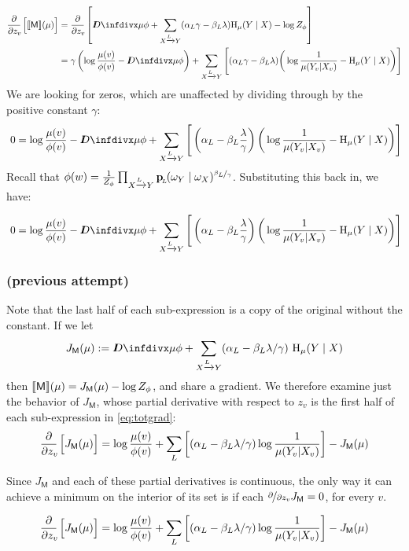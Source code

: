 \documentclass{article}
\newcommand{\sfM}{\mathsf M}
\newcommand{\alle}[1][L]{_{ X \xrightarrow{\!\!#1} Y }}
\begin{document}
	\begin{equation}
	\begin{aligned}
		\pz{\bbr{\sfM}(\mu)} &= 
		\pz{\kldiv{\mu}{\phi} + \sum\alle (\alpha_L \gamma - \beta_L \lambda ) \H_\mu(Y \mid X) - \log Z_\phi }\\
			&= 
			\gamma \left(\log\frac{\mu(v)}{\phi(v)} - \kldiv{\mu}{\phi} \right) + \sum\alle\Bigg[ (\alpha_L \gamma - \beta_L \lambda ) \bigg(\log \frac{1}{\mu(Y_v | X_v)} - \H_\mu(Y \mid X) \bigg) \Bigg] 
	\end{aligned}\label{eq:totgrad}
	\end{equation}
	We are looking for zeros, which are unaffected by dividing through by the positive constant $\gamma$:
	\[\ 0 = \log\frac{\mu(v)}{\phi(v)} - \kldiv{\mu}{\phi} + \sum\alle\Bigg[ \left(\alpha_L  - \beta_L \frac{\lambda}{\gamma} \right) \bigg(\log \frac{1}{\mu(Y_v | X_v)} - \H_\mu(Y \mid X) \bigg) \Bigg]  \]
	Recall that $\phi(w) = \frac{1}{Z_{\phi}}\prod\alle \bp(\omega_Y \mid \omega_X)^{\nicefrac{\beta_L}{\gamma}}$. Substituting this back in, we have:
	
	\[\ 0 = \log\frac{\mu(v)}{\phi(v)} - \kldiv{\mu}{\phi} + \sum\alle\Bigg[ \left(\alpha_L  - \beta_L \frac{\lambda}{\gamma} \right) \bigg(\log \frac{1}{\mu(Y_v | X_v)} - \H_\mu(Y \mid X) \bigg) \Bigg]  \]
	
	\subsubsection*{(previous attempt)}

	Note that the last half of each sub-expression is a copy of the original without the constant. If we let
	\[ J_\sfM(\mu) := \kldiv{\mu}{\phi} + \sum\alle (\alpha_L  - \beta_L \lambda / \gamma ) \ \H_\mu(Y \mid X) \]
	then $\bbr{\sfM}(\mu) = J_\sfM(\mu) - \log Z_\phi$, and share a gradient. We therefore examine just the behavior of $J_\sfM$, whose partial derivative with respect to $z_v$ is the first half of each sub-expression in \eqref{eq:totgrad}:
	\[ \pz{J_\sfM(\mu)} = \log\frac{\mu(v)}{\phi(v)} + \sum_L\left[ (\alpha_L  - \beta_L \lambda / \gamma ) \log \frac{1}{\mu(Y_v | X_v)} \right] - J_\sfM(\mu) \] 
	
	
	Since $J_\sfM$ and each of these partial derivatives is continuous, the only way it can achieve a minimum on the interior of its set is if each $\nicefrac{\partial}{\partial z_v} J_\sfM = 0$, for every $v$. 
	
	\[ \pz{J_\sfM(\mu)} = \log\frac{\mu(v)}{\phi(v)} + \sum_L\left[ (\alpha_L  - \beta_L \lambda / \gamma ) \log \frac{1}{\mu(Y_v | X_v)} \right] - J_\sfM(\mu) \] 
	
\end{document}
